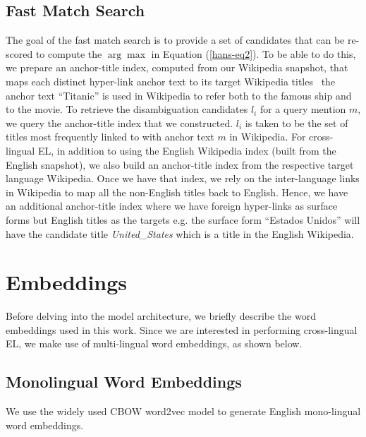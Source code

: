 \documentclass[letterpaper]{article} \usepackage{aaai18}  \usepackage{times}  \usepackage{helvet}  \usepackage{courier}  \usepackage{url}  \usepackage{graphicx}  \frenchspacing  \setlength{\pdfpagewidth}{8.5in}  \setlength{\pdfpageheight}{11in}  \usepackage{latexsym}
\begin{document}
\subsection{Fast Match Search}
\label{sec:fast-match}
The goal of the fast match search is to provide a set of candidates that can be re-scored to compute the $\arg\max$ in Equation (\ref{hans-eq2}). To be able to do this, we prepare an anchor-title index, computed from our Wikipedia snapshot, that
maps each distinct hyper-link anchor text to its target Wikipedia titles \eg\ the anchor text ``Titanic” is used in Wikipedia to refer both to the
famous ship and to the movie. To retrieve the disambiguation candidates $l_i$ for
a query mention $m$, we query the anchor-title index that we constructed. $l_i$
is taken to be the set of titles most frequently linked to with anchor
text $m$ in Wikipedia. For cross-lingual EL, in addition to using the English Wikipedia index (built from the English snapshot), we also build an anchor-title index from the respective target language Wikipedia. Once we have that index, we rely on the inter-language links in Wikipedia to map all the non-English titles back to English. Hence, we have an additional anchor-title index where we have foreign hyper-links as surface forms but English titles as the targets e.g. the surface form ``Estados Unidos'' will have the candidate title \textit{United\_States} which is a title in the English Wikipedia. \section{Embeddings}
Before delving into the model architecture, we briefly describe the word embeddings used in this work. 
Since we are interested in performing cross-lingual EL, we make use of multi-lingual word embeddings, as shown below.
\label{sec:embeddings}


\subsection{Monolingual Word Embeddings}
\label{sec:mono-emb}
We use the widely used CBOW word2vec model \cite{mikolov2013efficient} to generate English mono-lingual word embeddings.
\end{document}
